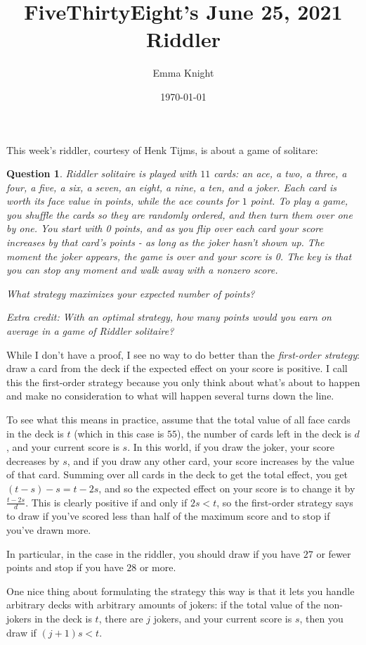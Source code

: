 \documentclass[11pt]{article}
\title{FiveThirtyEight's June 25, 2021 Riddler}
\author{Emma Knight}
\date{\today}
\newtheorem{question}[theorem]{Question}
\theoremstyle{definition}
\begin{document}
\maketitle
This week's riddler, courtesy of Henk Tijms, is about a game of solitare:
\begin{question}
Riddler solitaire is played with $11$ cards: an ace, a two, a three, a four, a five, a six, a seven, an eight, a nine, a ten, and a joker. Each card is worth its face value in points, while the ace counts for $1$ point. To play a game, you shuffle the cards so they are randomly ordered, and then turn them over one by one. You start with 0 points, and as you flip over each card your score increases by that card’s points - as long as the joker hasn’t shown up. The moment the joker appears, the game is over and your score is 0. The key is that you can stop any moment and walk away with a nonzero score.

What strategy maximizes your expected number of points?

\emph{Extra credit}: With an optimal strategy, how many points would you earn on average in a game of Riddler solitaire?
\end{question}

While I don't have a proof, I see no way to do better than the \emph{first-order strategy}: draw a card from the deck if the expected effect on your score is positive.  I call this the first-order strategy because you only think about what's about to happen and make no consideration to what will happen several turns down the line.

To see what this means in practice, assume that the total value of all face cards in the deck is $t$ (which in this case is $55$), the number of cards left in the deck is $d$, and your current score is $s$.  In this world, if you draw the joker, your score decreases by $s$, and if you draw any other card, your score increases by the value of that card.  Summing over all cards in the deck to get the total effect, you get $(t-s)-s = t-2s$, and so the expected effect on your score is to change it by $\frac{t-2s}{d}$.  This is clearly positive if and only if $2s < t$, so the first-order strategy says to draw if you've scored less than half of the maximum score and to stop if you've drawn more.

In particular, in the case in the riddler, you should draw if you have $27$ or fewer points and stop if you have $28$ or more.

One nice thing about formulating the strategy this way is that it lets you handle arbitrary decks with arbitrary amounts of jokers: if the total value of the non-jokers in the deck is $t$, there are $j$ jokers, and your current score is $s$, then you draw if $(j+1)s < t$.
\end{document}
